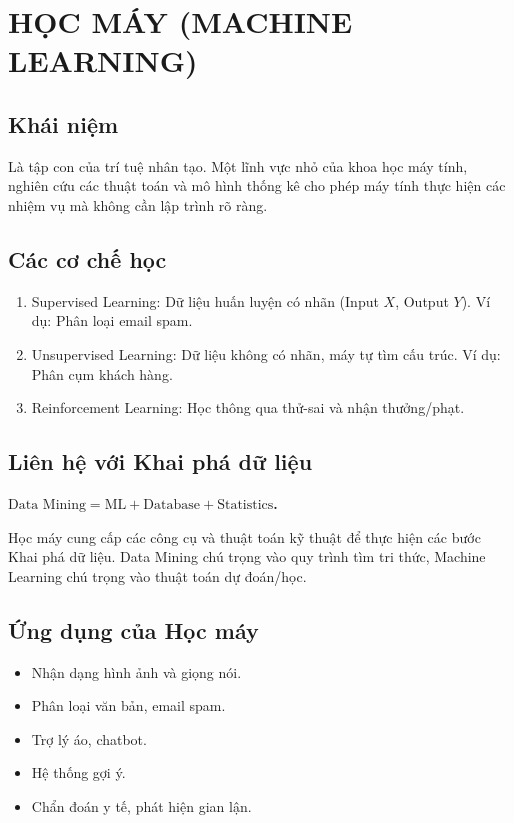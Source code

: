 \section{HỌC MÁY (MACHINE LEARNING)}

\subsection{Khái niệm}
Là tập con của trí tuệ nhân tạo. Một lĩnh vực nhỏ của khoa học máy tính, nghiên cứu các thuật toán và mô hình thống kê cho phép máy tính thực hiện các nhiệm vụ mà không cần lập trình rõ ràng.

\subsection{Các cơ chế học}
\begin{enumerate}
    \item Supervised Learning: Dữ liệu huấn luyện có nhãn (Input $X$, Output $Y$). Ví dụ: Phân loại email spam.
    \item Unsupervised Learning: Dữ liệu không có nhãn, máy tự tìm cấu trúc. Ví dụ: Phân cụm khách hàng.
    \item Reinforcement Learning: Học thông qua thử-sai và nhận thưởng/phạt.
\end{enumerate}

\subsection{Liên hệ với Khai phá dữ liệu}
{\centering\fontsize{17}{21}\selectfont\bfseries\boldmath
$\text{Data Mining} = \text{ML} + \text{Database} + \text{Statistics}$. \par}
Học máy cung cấp các công cụ và thuật toán kỹ thuật để thực hiện các bước Khai phá dữ liệu. Data Mining chú trọng vào quy trình tìm tri thức, Machine Learning chú trọng vào thuật toán dự đoán/học.

\subsection{Ứng dụng của Học máy}
\begin{itemize}
    \item Nhận dạng hình ảnh và giọng nói.
    \item Phân loại văn bản, email spam.
    \item Trợ lý áo, chatbot.
    \item Hệ thống gợi ý.
    \item Chẩn đoán y tế, phát hiện gian lận.
\end{itemize}